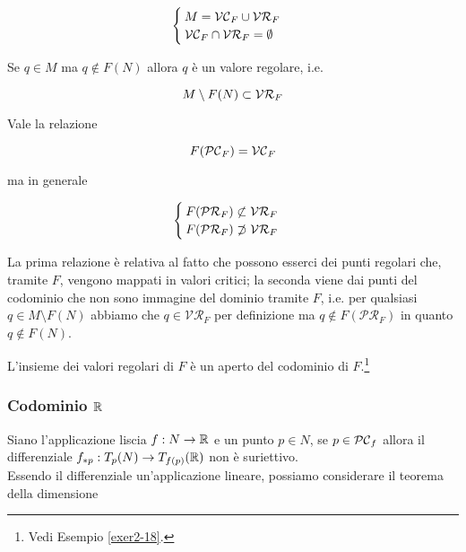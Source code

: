 \begin{equation}
	\begin{cases}
		M = \mathcal{VC}_{F} \cup \mathcal{VR}_{F} \\
		\mathcal{VC}_{F} \cap \mathcal{VR}_{F} = \emptyset
	\end{cases}
\end{equation}

\begin{remark}
	Se $ q \in M $ ma $ q \notin F(N) $ allora $ q $ è un valore regolare, i.e.
	
	\begin{equation}
		M \setminus F(N) \subset \mathcal{VR}_{F}
	\end{equation}
\end{remark}

\begin{remark}
	Vale la relazione
	
	\begin{equation}
		F(\mathcal{PC}_{F}) = \mathcal{VC}_{F}
	\end{equation}

	ma in generale
	
	\begin{equation}
		\begin{cases}
			F(\mathcal{PR}_{F}) \not\subset \mathcal{VR}_{F} \\
			F(\mathcal{PR}_{F}) \not\supset \mathcal{VR}_{F}
		\end{cases}
	\end{equation}

	La prima relazione è relativa al fatto che possono esserci dei punti regolari che, tramite $ F $, vengono mappati in valori critici; la seconda viene dai punti del codominio che non sono immagine del dominio tramite $ F $, i.e. per qualsiasi $ q \in M \setminus F(N) $ abbiamo che $ q \in \mathcal{VR}_{F} $ per definizione ma $ q \notin F(\mathcal{PR}_{F}) $ in quanto $ q \notin F(N) $.
\end{remark}

\begin{remark}
	L'insieme dei valori regolari di $ F $ è un aperto del codominio di $ F $.\footnote{%
		Vedi Esempio \ref{exer2-18}.%
	}
\end{remark}

\subsubsection{Codominio $ \mathbb{R} $}

Siano l'applicazione liscia $ f : N \to \mathbb{R} $ e un punto $ p \in N $, se $ p \in \mathcal{PC}_{f} $ allora il differenziale $ f_{*p} : T_{p}(N) \to T_{f(p)}(\mathbb{R}) $ non è suriettivo. \\
Essendo il differenziale un'applicazione lineare, possiamo considerare il teorema della dimensione

